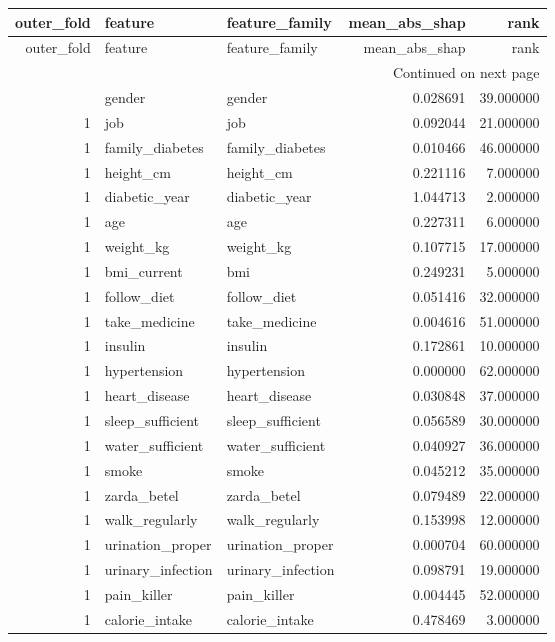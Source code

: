 \begin{longtable}{rllrr}
\toprule
outer\_fold & feature & feature\_family & mean\_abs\_shap & rank \\
\midrule
\endfirsthead
\toprule
outer\_fold & feature & feature\_family & mean\_abs\_shap & rank \\
\midrule
\endhead
\midrule
\multicolumn{5}{r}{Continued on next page} \\
\midrule
\endfoot
\bottomrule
\endlastfoot
1 & gender & gender & 0.028691 & 39.000000 \\
1 & job & job & 0.092044 & 21.000000 \\
1 & family\_diabetes & family\_diabetes & 0.010466 & 46.000000 \\
1 & height\_cm & height\_cm & 0.221116 & 7.000000 \\
1 & diabetic\_year & diabetic\_year & 1.044713 & 2.000000 \\
1 & age & age & 0.227311 & 6.000000 \\
1 & weight\_kg & weight\_kg & 0.107715 & 17.000000 \\
1 & bmi\_current & bmi & 0.249231 & 5.000000 \\
1 & follow\_diet & follow\_diet & 0.051416 & 32.000000 \\
1 & take\_medicine & take\_medicine & 0.004616 & 51.000000 \\
1 & insulin & insulin & 0.172861 & 10.000000 \\
1 & hypertension & hypertension & 0.000000 & 62.000000 \\
1 & heart\_disease & heart\_disease & 0.030848 & 37.000000 \\
1 & sleep\_sufficient & sleep\_sufficient & 0.056589 & 30.000000 \\
1 & water\_sufficient & water\_sufficient & 0.040927 & 36.000000 \\
1 & smoke & smoke & 0.045212 & 35.000000 \\
1 & zarda\_betel & zarda\_betel & 0.079489 & 22.000000 \\
1 & walk\_regularly & walk\_regularly & 0.153998 & 12.000000 \\
1 & urination\_proper & urination\_proper & 0.000704 & 60.000000 \\
1 & urinary\_infection & urinary\_infection & 0.098791 & 19.000000 \\
1 & pain\_killer & pain\_killer & 0.004445 & 52.000000 \\
1 & calorie\_intake & calorie\_intake & 0.478469 & 3.000000 \\

\end{longtable}
